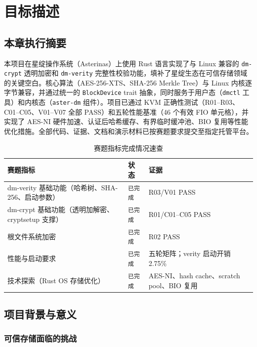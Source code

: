 \chapter{目标描述}

\section*{本章执行摘要}

本项目在星绽操作系统（Asterinas）上使用 Rust 语言实现了与 Linux 兼容的 \texttt{dm-crypt} 透明加密和 \texttt{dm-verity} 完整性校验功能，填补了星绽生态在可信存储领域的关键空白。核心算法（AES-256-XTS、SHA-256 Merkle Tree）与 Linux 内核逐字节兼容，并通过统一的 \texttt{BlockDevice} trait 抽象，同时服务于用户态（\texttt{dmctl} 工具）和内核态（\texttt{aster-dm} 组件）。项目已通过 KVM 正确性测试（R01--R03、C01--C05、V01--V07 全部 PASS）和五轮性能基准（46 个有效 FIO 单元格），并实现了 AES-NI 硬件加速、认证后哈希缓存、有界临时缓冲池、BIO 复用等性能优化措施。全部代码、证据、文档和演示材料已按赛题要求提交至指定托管平台。

\begin{table}[H]
    \centering
    \caption{赛题指标完成情况速查}
    \begin{tabular}{p{}p{}p{}}
        \toprule
        \textbf{赛题指标} & \textbf{状态} & \textbf{证据} \\
        \midrule
        dm-verity 基础功能（哈希树、SHA-256、启动参数） & \texttt{已完成} & R03/V01 PASS \\
        dm-crypt 基础功能（透明加解密、cryptsetup 支撑） & \texttt{已完成} & R01/C01--C05 PASS \\
        根文件系统加密 & \texttt{已完成} & R02 PASS \\
        性能与启动要求 & \texttt{已完成} & 五轮矩阵；verity 启动开销 2.75\% \\
        技术探索（Rust OS 存储优化） & \texttt{已完成} & AES-NI、hash cache、scratch pool、BIO 复用 \\
        \bottomrule
    \end{tabular}
\end{table}

\section{项目背景与意义}

\subsection{可信存储面临的挑战}

